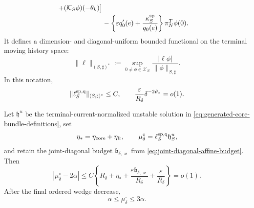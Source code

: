 \begin{theorem}
\begin{align}
       +(\mathcal K_S\phi)(-\theta_k)\bigr]\notag\\
 &-\left\{\varepsilon q_0'(e)
       +\frac{\kappa_S^{\rm sp}}{q_0(e)}\right\}
       \pi_N^T\phi(0).                          \label{eq:physical-speed-quotient-expanded-row}
\end{align}
It defines a dimension- and diagonal-uniform bounded functional on the
terminal moving history space:
\begin{equation}
 \|\ell\|_{(S,\sharp)^*}
 :=\sup_{0\ne\phi\in\mathscr X_N}
       \frac{|\ell\phi|}{\|\phi\|_{S,\sharp}}.  \label{eq:terminal-moving-history-dual-norm}
\end{equation}
In this notation,
\begin{equation}
 \|\ell_S^{\rm sp,q}\|_{(S,\sharp)^*}\le C,
 \qquad
 \frac{\varepsilon}{R_\delta}\delta^{-2\vartheta_*}=o(1).
                                                        \label{eq:physical-speed-quotient-row-bound}
\end{equation}

Let \(\mathfrak h^u\) be the terminal-current-normalized unstable solution
in \cref{eq:generated-core-bundle-definitions}, set
\begin{equation}
 \eta_*=\eta_{\rm core}+\eta_{\rm fr},
 \qquad
 \mu_\delta^\circ
 =\ell_S^{\rm sp,q}\mathfrak h_S^u,             \label{eq:physical-speed-unstable-coefficient}
\end{equation}
and retain the joint-diagonal budget
\(\mathfrak b_{\delta,\varkappa}\) from
\cref{eq:joint-diagonal-affine-budget}.  Then
\begin{equation}
 \left|\mu_\delta^\circ-2\alpha\right|
 \le C\left\{
 R_\delta+\eta_*
 +\frac{\varepsilon\mathfrak b_{\delta,\varkappa}}{R_\delta}
 +\frac{\varepsilon}{R_\delta}
 \right\}=o(1).                                 \label{eq:physical-speed-unstable-transversality}
\end{equation}
After the final ordered wedge decrease,
\begin{equation}
 \alpha\le\mu_\delta^\circ\le3\alpha.          \label{eq:physical-speed-unstable-margin}
\end{equation}


\end{theorem}
